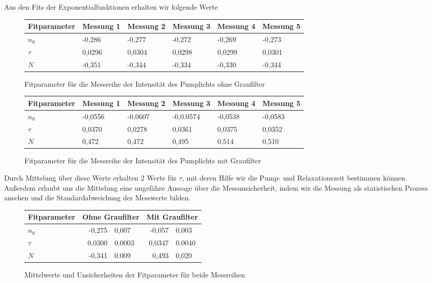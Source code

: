 \documentclass[bigchapter,colorback,accentcolor=tud4b,linedtoc,11pt]{tudreport}
\begin{document}
Aus den Fits der Exponentialfunktionen erhalten wir folgende Werte
\begin{figure}[h]
  \centering
  \begin{tabular}{l|lllll}
    Fitparameter & Messung 1 & Messung 2 & Messung 3 & Messung 4 & Messung 5 \\ \hline
    $n_0$        & -0,286    & -0,277    & -0,272    & -0,269    & -0,273    \\
    $\tau$       & 0,0296    & 0,0304    & 0,0298    & 0,0299    & 0,0301    \\
    $N$          & -0,351    & -0,344    & -0,334    & -0,330    & -0,344    \\
  \end{tabular}
  \caption{Fitparameter für die Messreihe der Intensität des Pumplichts ohne Graufilter}
\end{figure}

\begin{figure}[h]
  \centering
  \begin{tabular}{l|lllll}
    Fitparameter & Messung 1 & Messung 2 & Messung 3 & Messung 4 & Messung 5 \\ \hline
    $n_0$        & -0,0556   & -0,0607   & -0,0.0574 & -0,0538   & -0,0583   \\
    $\tau$       & 0,0370    & 0,0278    & 0,0361    & 0,0375    & 0,0352    \\
    $N$          & 0,472     & 0,472     & 0,495     & 0,514     & 0,510     \\
  \end{tabular}
  \caption{Fitparameter für die Messreihe der Intensität des Pumplichts mit Graufilter}
\end{figure}

Durch Mittelung über diese Werte erhalten 2 Werte für $\tau$, mit deren Hilfe
wir die Pump- und Relaxationszeit bestimmen können. Außerdem erlaubt uns die
Mittelung eine ungefähre Aussage über die Messunsicherheit, indem wir die
Messung als statistischen Prozess ansehen und die Standardabweichung der
Messwerte bilden.

\begin{figure}[h]
  \centering
  \begin{tabular}{l|r@{$\pm$}l r@{$\pm$}l}
        Fitparameter & \multicolumn{2}{c}{Ohne Graufilter} & \multicolumn{2}{c}{Mit Graufilter} \\ \hline
    $n_0$        & -0,275                           & 0,007  & -0,057 & 0,003         \\
    $\tau$       & 0,0300                           & 0.0003 & 0,0347 & 0.0040        \\
    $N$          & -0,341                           & 0.009  & 0,493  & 0,020         \\
  \end{tabular}
  \caption{Mittelwerte und Unsicherheiten der Fitparameter für beide Messreihen}
\end{figure}
\end{document}
